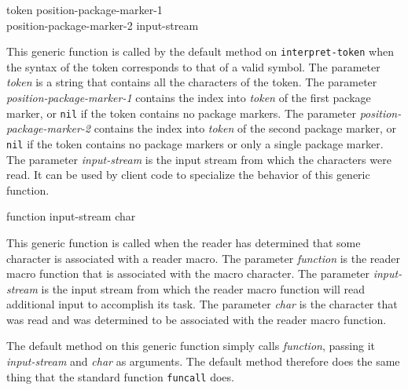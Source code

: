  {token position-package-marker-1\\
  position-package-marker-2 input-stream}

This generic function is called by the default method on
\texttt{interpret-token} when the syntax of the token corresponds to
that of a valid symbol.  The parameter \textit{token} is a string that
contains all the characters of the token.  The parameter
\textit{position-package-marker-1} contains the index into
\textit{token} of the first package marker, or \texttt{nil} if the
token contains no package markers.  The parameter
\textit{position-package-marker-2} contains the index into
\textit{token} of the second package marker, or \texttt{nil} if the
token contains no package markers or only a single package marker.
The parameter \textit{input-stream} is the input stream from which the
characters were read.  It can be used by client code to specialize the
behavior of this generic function.

 {function input-stream char}

This generic function is called when the reader has determined that
some character is associated with a reader macro.  The parameter
\textit{function} is the reader macro function that is associated with
the macro character.  The parameter \textit{input-stream} is the input
stream from which the reader macro function will read additional input
to accomplish its task.  The parameter \textit{char} is the character
that was read and was determined to be associated with the reader
macro function.

The default method on this generic function simply calls
\textit{function}, passing it \textit{input-stream} and \textit{char}
as arguments.  The default method therefore does the same thing that
the standard \commonlisp{} function \texttt{funcall} does.
